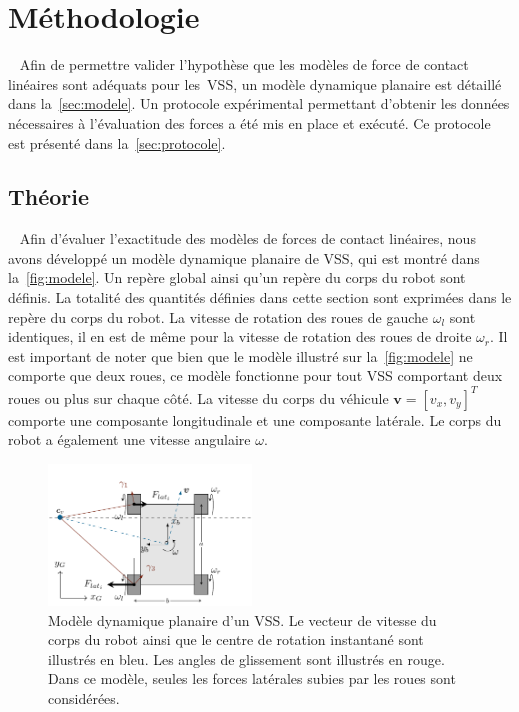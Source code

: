 \section{Méthodologie}~\label{sec:metho}
Afin de permettre valider l'hypothèse que les modèles de force de contact linéaires sont adéquats pour les~\ac{VSS}, un modèle dynamique planaire est détaillé dans la~\autoref{sec:modele}.
Un protocole expérimental permettant d'obtenir les données nécessaires à l'évaluation des forces a été mis en place et exécuté.
Ce protocole est présenté dans la~\autoref{sec:protocole}.

\subsection{Théorie}~\label{sec:modele}
Afin d'évaluer l'exactitude des modèles de forces de contact linéaires, nous avons développé un modèle dynamique planaire de \ac{VSS}, qui est montré dans la~\autoref{fig:modele}.
Un repère global ainsi qu'un repère du corps du robot sont définis.
La totalité des quantités définies dans cette section sont exprimées dans le repère du corps du robot.
La vitesse de rotation des roues de gauche $\omega_l$ sont identiques, il en est de même pour la vitesse de rotation des roues de droite $\omega_r$. 
Il est important de noter que bien que le modèle illustré sur la~\autoref{fig:modele} ne comporte que deux roues, ce modèle fonctionne pour tout \ac{VSS} comportant deux roues ou plus sur chaque côté.
La vitesse du corps du véhicule $\bm v = [v_x, v_y]^T$ comporte une composante longitudinale et une composante latérale.
Le corps du robot a également une vitesse angulaire $\omega$.

\begin{figure}[htpb]
	\centering
	\includegraphics[width=0.48\textwidth]{figs/modele.pdf}
	\caption{Modèle dynamique planaire d'un \ac{VSS}.
			Le vecteur de vitesse du corps du robot ainsi que le centre de rotation instantané sont illustrés en bleu.
			Les angles de glissement sont illustrés en rouge.
			Dans ce modèle, seules les forces latérales subies par les roues sont considérées.}
	\label{fig:modele}
\end{figure}

